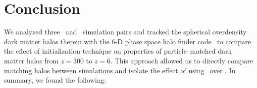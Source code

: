 
%
%

\section{Conclusion}
\label{sec:conclusion}



We analyzed three \lpt\ and \za\ simulation pairs and tracked the spherical overdensity dark matter halos therein with the 6-D phase space halo finder code \rockstar\ to compare the effect of initialization technique on properties of particle--matched dark matter halos from $z = 300$ to $z = 6$.  This approach allowed us to directly compare matching halos between simulations and isolate the effect of using \lpt\ over \za.  In summary, we found the following:

